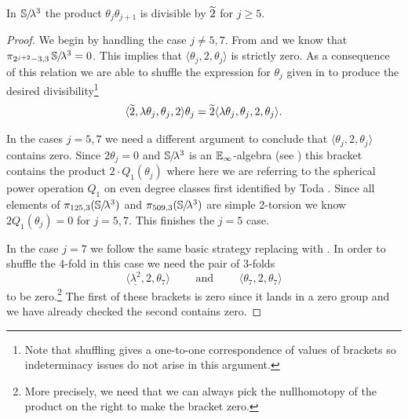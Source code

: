 \begin{lem} \label{lem:theta-product-divisible}
  In $\operatorname{\mathbb{S}}\hspace{-2.2pt}/\!\lambda^3$ the product $\theta_{j}\theta_{j+1}$ is divisible by $\wt{2}$ for $j \geq 5$.  
\end{lem}

\begin{proof}
  We begin by handling the case $j \neq 5,7$.
  From  and  we know that $\pi_{2^{j+2}-3, 3}\operatorname{\mathbb{S}}\hspace{-2.2pt}/\!\lambda^3 = 0$. This implies that $\langle \theta_j, 2, \theta_j \rangle$ is strictly zero. As a consequence of this relation we are able to shuffle the expression for $\theta_j$ given in  to produce the desired divisibility\footnote{Note that shuffling gives a one-to-one correspondence of values of brackets so indeterminacy issues do not arise in this argument.}
  \[ \langle \wt{2}, \lambda \theta_j, \theta_j, 2 \rangle \theta_j = \wt{2} \langle \lambda \theta_j, \theta_j, 2,  \theta_j \rangle. \]

  In the cases $j=5,7$ we need a different argument to conclude that
  $\langle \theta_j, 2, \theta_j \rangle$ contains zero.
  Since $2\theta_j = 0$ and $\operatorname{\mathbb{S}}\hspace{-2.2pt}/\!\lambda^3$ is an $\operatorname{\mathbb{E}}_\infty$-algebra (see )
  this bracket contains the product $2 \cdot Q_1(\theta_j)$ where here we are referring to the spherical power operation $Q_1$ on even degree classes first identified by Toda \cite[p.27-28]{TodaBook}. Since all elements of $\pi_{125,3}(\operatorname{\mathbb{S}}\hspace{-2.2pt}/\!\lambda^3)$ and $\pi_{509,3}(\operatorname{\mathbb{S}}\hspace{-2.2pt}/\!\lambda^3)$ are simple 2-torsion we know $2 Q_1(\theta_j) =0$ for $j=5,7$. This finishes the $j=5$ case.
  
  In the case $j=7$ we follow the same basic strategy replacing  with .
  In order to shuffle the 4-fold in this case we need the pair of 3-folds
  \[ \langle \underline{\lambda^2}, 2, \theta_7 \rangle \qquad \text{ and } \qquad  \langle \theta_7, 2, \theta_7 \rangle\]
  to be zero.\footnote{More precisely, we need that we can always pick the nullhomotopy of the product on the right to make the bracket zero.} The first of these brackets is zero since it lands in a zero group and we have already checked the second contains zero.
\end{proof}

